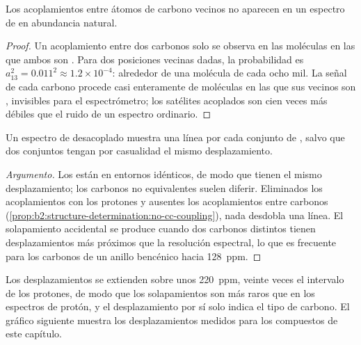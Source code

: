\begin{proposition}\label{prop:b2:structure-determination:no-cc-coupling}
Los acoplamientos entre átomos de carbono vecinos no aparecen en un espectro de  en abundancia
natural.
\end{proposition}

\begin{proof}
Un acoplamiento entre dos carbonos solo se observa en las moléculas en las que ambos son . Para dos posiciones
vecinas dadas, la probabilidad es $a_{13}^2 = 0.011^2 \approx 1.2 \times 10^{-4}$: alrededor de una
molécula de cada ocho mil. La señal de cada carbono procede casi enteramente de moléculas en las que sus
vecinos son , invisibles para el espectrómetro; los satélites acoplados son cien veces
más débiles que el ruido de un espectro ordinario.
\end{proof}

\begin{proposition}\label{prop:b2:structure-determination:signals}
Un espectro de  desacoplado muestra una línea por cada conjunto de , salvo que dos conjuntos
tengan por casualidad el mismo desplazamiento.
\end{proposition}

\begin{proof}[Argumento]
Los  están en entornos idénticos, de modo que tienen el mismo desplazamiento; los carbonos no equivalentes
suelen diferir. Eliminados los acoplamientos con los protones y ausentes los acoplamientos entre carbonos
(\cref{prop:b2:structure-determination:no-cc-coupling}), nada desdobla una línea. El solapamiento accidental
se produce cuando dos carbonos distintos tienen desplazamientos más próximos que la resolución espectral, lo que es frecuente para los
carbonos de un anillo bencénico hacia \qty{128}{ppm}.
\end{proof}

Los desplazamientos se extienden sobre unos \qty{220}{ppm}, veinte veces el intervalo de los protones, de modo que los solapamientos son más raros que
en los espectros de protón, y el desplazamiento por sí solo indica el tipo de carbono. El gráfico siguiente muestra los desplazamientos
medidos para los compuestos de este capítulo.

